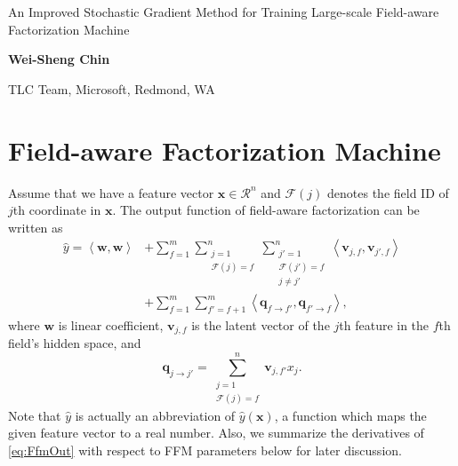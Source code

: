 \documentclass[11pt]{article}
\newcommand{\bsym}[1]{\ensuremath{\boldsymbol{#1}}}
\newcommand{\bw}{\ensuremath{\bsym{w}}}
\newcommand{\bv}{\ensuremath{\bsym{v}}}
\newcommand{\bx}{\ensuremath{\bsym{x}}}
\newcommand{\bq}{\ensuremath{\bsym{q}}}
\newcommand{\bbr}{\ensuremath{\mathcal R}}
\newcommand{\field}{\ensuremath{\mathcal F}}
\newcommand{\dotprod}[2]{\ensuremath{\left\langle #1,#2 \right\rangle}}
\begin{document}
\begin{center}
    {\Large An Improved Stochastic Gradient Method for Training Large-scale Field-aware Factorization Machine}
\end{center}
\begin{center}
    {\bf \large Wei-Sheng Chin}
\end{center}
\begin{center}
{TLC Team, Microsoft, Redmond, WA}\\
\end{center}

\section{Field-aware Factorization Machine}
Assume that we have a feature vector $\bx\in\bbr^n$ and $\field(j)$ denotes the field ID of $j$th coordinate in $\bx$.
The output function of field-aware factorization can be written as
\begin{equation}
    \begin{aligned}
    \hat{y} = \dotprod{\bw}{\bw} &+ \sum_{f=1}^m \sum_{\substack{j=1 \\ \field(j)=f}}^n \sum_{\substack{j'=1 \\ \field(j') = f \\ j\ne j'}}^n \dotprod{\bv_{j, f}}{\bv_{j', f}} \\
                                 &+ \sum_{f=1}^m\sum_{f'=f+1}^m \dotprod{\bq_{f\rightarrow f'}}{\bq_{f'\rightarrow f}},
    \end{aligned}
    \label{eq:FfmOut}
\end{equation}
where $\bw$ is linear coefficient, $\bv_{j, f}$ is the latent vector of the $j$th feature in the $f$th field's hidden space, and
\begin{equation}
    \bq_{j\rightarrow j'} = \sum_{ \substack{j=1 \\ \field(j)=f} }^n \bv_{j, f'} x_j.
\end{equation}
Note that $\hat{y}$ is actually an abbreviation of $\hat{y}(\bx)$, a function which maps the given feature vector to a real number.
Also, we summarize the derivatives of \eqref{eq:FfmOut} with respect to FFM parameters below for later discussion.
\end{document}
